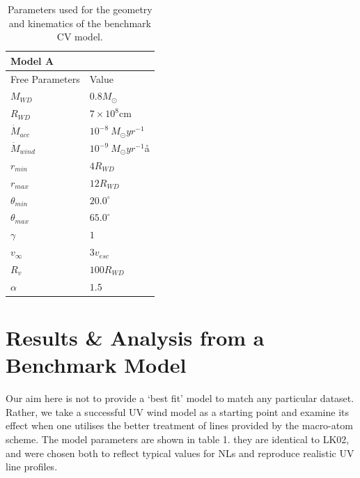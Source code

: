 \documentclass[preprint, a4paper, 11pt]{aastex}
\begin{document}
\begin{table}
\centering
\begin{tabular}{p{3cm}p{4cm}}
Model A \\
\hline Free Parameters 	&	 Value \\ 
\hline \hline 
$M_{WD}$ 	 &	 $0.8 M_{\odot}$ \\ 
$R_{WD}$ 	 &	 $7\times10^{8}$cm\\ 
$\dot{M}_{acc}$ 	 &	 $10^{-8}~M_{\odot}yr^{-1}$\\ 
$\dot{M}_{wind}$  &	$10^{-9}~M_{\odot}yr^{-1}$å\\ 
$r_{min}$ 	&	 $4 R_{WD}$\\ 
$r_{max}$ 	&	 $12 R_{WD}$ \\ 
$\theta_{min}$ 	&	 $20.0^{\circ}$ \\ 
$\theta_{max}$ 	&	 $65.0^{\circ}$ \\ 
$\gamma$ 	&	 $1$ \\ 
$v_{\infty}$ 	&	 $3v_{esc}$ \\ 
$R_v$ 	        &	 $100 R_{WD}$ \\ 
$\alpha$ 	&	 $1.5$ \\
\end{tabular}
\centering
\caption{
Parameters used for the geometry and kinematics of the benchmark CV model.}
\label{wind_param}
\end{table}




\section{Results \& Analysis from a Benchmark Model}


Our aim here is not
to provide a `best fit' model to match any particular dataset.
Rather, we take
a successful UV wind model as a starting point
and examine its effect 
when one utilises the better treatment of lines provided
by the macro-atom scheme.
The model parameters are shown in table 1. 
they are identical to LK02, and were chosen both to reflect typical
values for NLs and reproduce realistic UV line profiles.
\end{document}
